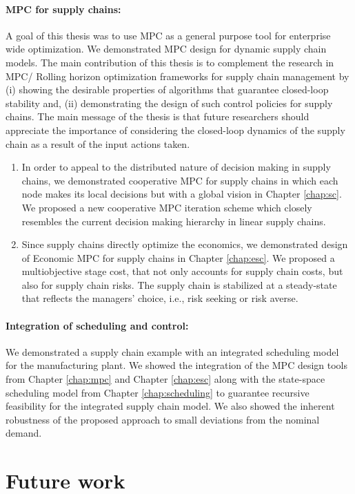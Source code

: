 \paragraph{MPC for supply chains:} A goal of this thesis was to use
MPC as a general purpose tool for enterprise wide optimization. We
demonstrated MPC design for dynamic supply chain models. The main
contribution of this thesis is to complement the research in 
MPC/ Rolling horizon optimization frameworks for supply chain
management by (i) showing the desirable properties of algorithms that
guarantee closed-loop stability and, (ii) demonstrating the design of
such control policies for supply chains.  The main message of the thesis  is
that future researchers should appreciate the importance of
considering the closed-loop dynamics of the supply chain as a result
of the input actions taken. 
\begin{enumerate}
\item In order to appeal to the distributed nature of decision making in supply
chains, we demonstrated cooperative MPC for supply chains in which
each node makes its local decisions but with a global vision in
Chapter \ref{chap:sc}. We
proposed a new cooperative MPC iteration scheme which closely
resembles the current decision making hierarchy in linear supply
chains.
\item Since supply chains directly optimize the economics, we
  demonstrated design of Economic MPC for supply chains in Chapter
  \ref{chap:esc}. We proposed a multiobjective stage cost, that not
  only accounts for supply chain costs, but also for supply chain
  risks. The supply chain is  stabilized at a steady-state that
  reflects the managers' choice, i.e., risk seeking or risk averse.
\end{enumerate}

\paragraph{Integration of scheduling and control:} We demonstrated a
supply chain example with an integrated scheduling model for the
manufacturing plant. We showed the integration of the MPC design tools from
Chapter \ref{chap:mpc} and Chapter \ref{chap:esc} along with the
state-space scheduling model from Chapter \ref{chap:scheduling} to
guarantee recursive feasibility for the integrated supply chain
model. We also showed the inherent robustness of the proposed approach
to small deviations from the nominal demand.

\section*{Future work}

